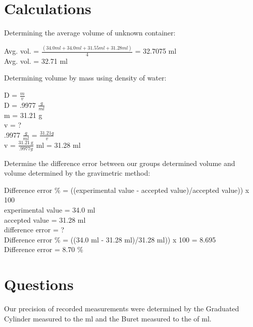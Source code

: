 \documentclass[10pt]{article}
\begin{document}
\section{Calculations}
\hspace{5ex}Determining the average volume of unknown container:
\begin{center}
Avg. vol. = $\frac{(34.0 ml + 34.0 ml + 31.55 ml + 31.28 ml)}{4}$ = 32.7075 ml \\
Avg. vol. = 32.71 ml\\
\end{center}
\hspace{5ex}Determining volume by mass using density of water:
\begin{center}
D = $\frac{m}{v}$ \\
D = .9977 $\frac{g}{ml}$ \\
m = 31.21 g \\
v = ? \\

.9977 $\frac{g}{ml}$ = $\frac{31.21 g}{v}$ \\
v =  $\frac{\SI{31.21}{\gram}}{.9977 g}$ ml = 31.28 ml \\
\end{center}
\hspace{5ex}Determine the difference error between our groups determined volume and volume determined by the gravimetric method:
\begin{center}
Difference error \% = ((experimental value - accepted value)/accepted value)) x 100 \\
experimental value = 34.0 ml\\
accepted value = 31.28 ml\\
difference error = ? \\
Difference error \% = ((34.0 ml - 31.28 ml)/31.28 ml)) x 100 = 8.695 \\
Difference error = 8.70 \%
\end{center}

\section{Questions}
\hspace{5ex}Our precision of recorded measurements were determined by the Graduated Cylinder measured to the ml and the Buret measured to the  of ml.
\end{document}
